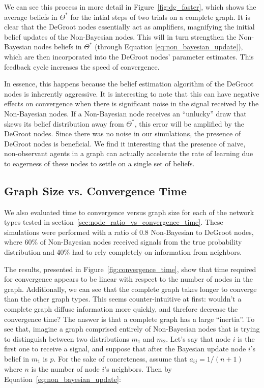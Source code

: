 \documentclass[letterpaper, 11pt, conference]{ieeeconf}
\begin{document}
We can see this process in more detail in Figure~\ref{fig:dg_faster}, which shows the average beliefs in $\Theta^*$ for the intial steps of two trials on a complete graph. It is clear that the DeGroot nodes essentially act as amplifiers, magnifying the initial belief updates of the Non-Bayesian nodes. This will in turn strengthen the Non-Bayesian nodes beliefs in $\Theta^*$ (through Equation \ref{eq:non_bayesian_update}), which are then incorporated into the DeGroot nodes' parameter estimates. This feedback cycle increases the speed of convergence.

In essence, this happens because the belief estimation algorithm of the DeGroot nodes is inherently aggressive. It is interesting to note that this can have negative effects on convergence when there is significant noise in the signal received by the Non-Bayesian nodes. If a Non-Bayesian node receives an ``unlucky'' draw that skews its belief distribution away from $\Theta^*$, this error will be amplified by the DeGroot nodes. Since there was no noise in our simulations, the presence of DeGroot nodes is beneficial. We find it interesting that the presence of naive, non-observant agents in a graph can actually accelerate the rate of learning due to eagerness of these nodes to settle on a single set of beliefs.


\subsection{Graph Size vs. Convergence Time}

We also evaluated time to convergence versus graph size for each of the network types tested in section~\ref{sec:node_ratio_vs_convergence_time}.  These simulations were performed with a ratio of 0.8 Non-Bayesian to DeGroot nodes, where 60\% of Non-Bayesian nodes received signals from the true probability distribution and 40\% had to rely completely on information from neighbors.

The results, presented in Figure~\ref{fig:convergence_time}, show that time required for convergence appears to be linear with respect to the number of nodes in the graph. Additionally, we can see that the complete graph takes longer to converge than the other graph types. This seems counter-intuitive at first: wouldn't a complete graph diffuse information more quickly, and threfore decrease the convergence time? The answer is that a complete graph has a large ``inertia''. To see that, imagine a graph comprised entirely of Non-Bayesian nodes that is trying to distinguish between two distributions $m_1$ and $m_2$. Let's say that node $i$ is the first one to receive a signal, and suppose that after the Bayesian update node $i$'s belief in $m_1$ is $p$. For the sake of concreteness, assume that $a_{ij}=1/(n+1)$ where $n$ is the number of node $i$'s neighbors. Then by Equation~\ref{eq:non_bayesian_update}:
\end{document}
